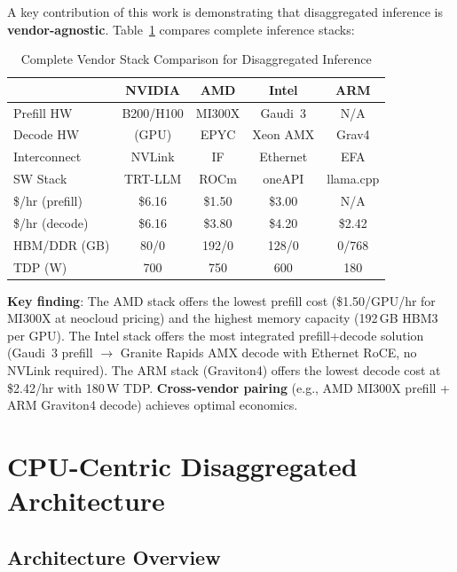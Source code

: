 \documentclass[conference,10pt]{IEEEtran}
\begin{document}
A key contribution of this work is demonstrating that disaggregated inference is \textbf{vendor-agnostic}. Table~\ref{tab:vendorstack} compares complete inference stacks:

\begin{table}[!htbp]
\caption{Complete Vendor Stack Comparison for Disaggregated Inference}
\label{tab:vendorstack}
\centering\scriptsize
\begin{tabular}{@{}lcccc@{}}
\toprule
& \textbf{NVIDIA} & \textbf{AMD} & \textbf{Intel} & \textbf{ARM} \\
\midrule
Prefill HW & B200/H100 & MI300X & Gaudi~3 & N/A \\
Decode HW & (GPU) & EPYC & Xeon AMX & Grav4 \\
Interconnect & NVLink & IF & Ethernet & EFA \\
SW Stack & TRT-LLM & ROCm & oneAPI & llama.cpp \\
\$/hr (prefill) & \$6.16 & \$1.50 & \$3.00 & N/A \\
\$/hr (decode) & \$6.16 & \$3.80 & \$4.20 & \$2.42 \\
HBM/DDR (GB) & 80/0 & 192/0 & 128/0 & 0/768 \\
TDP (W) & 700 & 750 & 600 & 180 \\
\bottomrule
\end{tabular}
\end{table}

\textbf{Key finding}: The AMD stack offers the lowest prefill cost (\$1.50/GPU/hr for MI300X at neocloud pricing) and the highest memory capacity (192\,GB HBM3 per GPU). The Intel stack offers the most integrated prefill+decode solution (Gaudi~3 prefill $\to$ Granite Rapids AMX decode with Ethernet RoCE, no NVLink required). The ARM stack (Graviton4) offers the lowest decode cost at \$2.42/hr with 180\,W TDP. \textbf{Cross-vendor pairing} (e.g., AMD MI300X prefill + ARM Graviton4 decode) achieves optimal economics.

\section{CPU-Centric Disaggregated Architecture}
\label{sec:arch}

\subsection{Architecture Overview}
\end{document}
